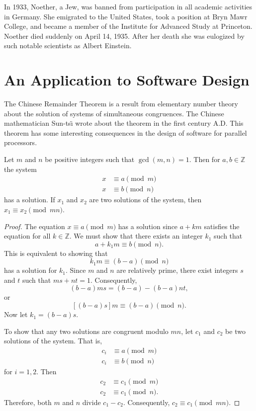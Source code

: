 { 
In 1933, Noether, a Jew, was banned from participation in all academic
activities in Germany. She emigrated to the United States, took a
position at Bryn Mawr College, and became a member of the Institute
for Advanced Study at Princeton. Noether died suddenly on April 14,
1935. After her death she was eulogized by such notable
scientists as Albert Einstein. 
\histbox
} 
 
 
 
\section{An Application to Software Design}
 
 
The Chinese Remainder Theorem is a result from elementary number
theory about the solution of systems of simultaneous congruences. The 
Chinese mathematician Sun-ts\"{\i} wrote about the theorem in the
first century A.D\@. This theorem has some interesting
consequences in the design of software for parallel processors.
 
 
\begin{lemma}
Let $m$ and $n$ be positive integers such that $\gcd( m, n) = 1$. Then
for $a, b \in {\mathbb Z}$ the system
\begin{align*}
x & \equiv  a \pmod{m} \\
x & \equiv  b \pmod{n} 
\end{align*}
has a solution.  If $x_1$ and $x_2$ are two solutions of the system,
then  $x_1 \equiv x_2 \pmod{mn}$.
\end{lemma}
 
 
\begin{proof}
The equation $x \equiv a \pmod{m}$ has a solution since $a +km$
satisfies the equation for all $k \in {\mathbb Z}$.  We must show that
there exists an integer $k_1$ such that 
\[
a + k_1 m \equiv b \pmod{n}.
\] 
This is equivalent to showing that 
\[
k_1 m \equiv (b-a) \pmod{n}
\] 
has a solution for $k_1$.  Since $m$ and $n$ are relatively prime,
there exist integers $s$ and $t$ such that $ms + nt = 1$.
Consequently, 
\[
(b-a) ms = (b-a) -(b-a) nt,
\]
or 
\[
[(b-a)s]m \equiv (b-a) \pmod{n}. 
\]
Now let $k_1 = (b-a)s$.
 
 
To show that any two solutions are congruent modulo $mn$, let $c_1$ and
$c_2$ be two solutions of  the system. That is,
\begin{align*}
c_i & \equiv  a \pmod{m} \\
c_i & \equiv  b \pmod{n} 
\end{align*}
for $i = 1, 2$. Then
\begin{align*}
c_2 & \equiv  c_1 \pmod{m} \\
c_2 & \equiv  c_1 \pmod{n}. 
\end{align*}
Therefore, both $m$ and $n$ divide $c_1 - c_2$. Consequently,
$c_2 \equiv c_1 \pmod{mn}$.
\mbox{\hspace*{1in}}  
\end{proof}
 
